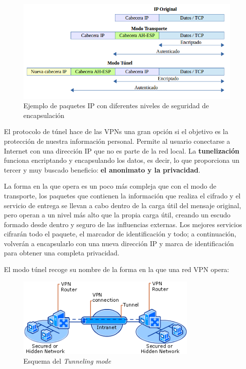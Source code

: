 	\begin{figure}[h]
		\centerline{
			\mbox{\includegraphics[width=5.00in]{images/IPsec.png}}
		}
		\caption{Ejemplo de paquetes IP con diferentes niveles de seguridad de encapsulación~\cite{article:ibm_ip}}
		\label{fig:IPtypes}
	\end{figure}

El protocolo de túnel hace de las VPNs una gran opción si el objetivo es la protección de nuestra información personal. 
Permite al usuario conectarse a Internet con una dirección IP que no es parte de la red local. La \textbf{tunelización} funciona encriptando y encapsulando los datos, es decir, lo que proporciona un tercer y muy buscado beneficio: \textbf{el anonimato y la privacidad}. 

La forma en la que opera es un poco más compleja que con el modo de transporte, los paquetes que contienen la información que realiza el cifrado y el servicio de entrega se llevan a cabo dentro de la carga útil del mensaje original, pero operan a un nivel más alto que la propia carga útil, creando un escudo formado desde dentro y seguro de las influencias externas. Los mejores servicios cifrarán todo el paquete, el marcador de identificación y todo; a continuación, volverán a encapsularlo con una nueva dirección IP y marca de identificación para obtener una completa privacidad.

El modo túnel recoge su nombre de la forma en la que una red VPN opera:

  		\begin{figure}[h]
  			\centerline{
  				\mbox{\includegraphics[width=3.50in]{images/vpn.png}}
  			}
  			\caption{Esquema del \textit{Tunneling mode}~\cite{article:tunnelMode}}
  			\label{fig:tunnelMode}
  		\end{figure}
 
